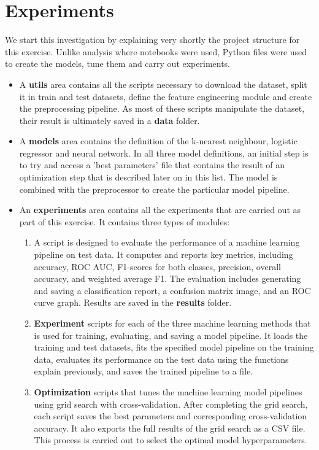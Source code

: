 
\section{Experiments}

We start this investigation by explaining very shortly the project structure for this exercise. Unlike analysis where notebooks were used, Python files were used to create the models, tune them and carry out experiments. 


\begin{itemize}
	\item A \textbf{utils} area contains all the scripts necessary to download the dataset, split it in train and test datasets, define the feature engineering module and create the preprocessing pipeline. As most of these scripts manipulate the dataset, their result is ultimately saved in a \textbf{data} folder.
	
	\item A \textbf{models} area contains the definition of the k-nearest neighbour, logistic regressor and neural network. In all three model definitions, an initial step is to try and access a 'best parameters' file that contains the result of an optimization step that is described later on in this list. The model is combined with the preprocessor  to create the particular model pipeline.
	
	\item An \textbf{experiments} area contains all the experiments that are carried out as part of this exercise. It contains three types of modules:
	
	\begin{enumerate}
		\item A script is designed to evaluate the performance of a machine learning pipeline on test data. It computes and reports key metrics, including accuracy, ROC AUC, F1-scores for both  classes, precision, overall accuracy, and weighted average F1. The evaluation includes generating and saving a classification report, a confusion matrix image, and an ROC curve graph. Results are saved in the \textbf{results} folder.
		
		\item \textbf{Experiment} scripts for each of the three machine learning methods that is used for training, evaluating, and saving a model pipeline. It loads the training and test datasets, fits the specified model pipeline on the training data, evaluates its performance on the test data using the functions explain previously, and saves the trained pipeline to a file.
		
		\item \textbf{Optimization} scripts that tunes the machine learning model pipelines using grid search with cross-validation. After completing the grid search, each script saves the best parameters and corresponding cross-validation accuracy. It also exports the full results of the grid search as a CSV file. This process is carried out to select the optimal model hyperparameters.
	\end{enumerate}
\end{itemize}



